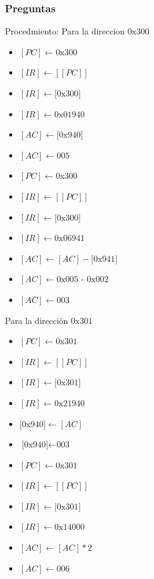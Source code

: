 \documentclass{article}
\begin{document}
\subsubsection{Preguntas}
\label{sec:org5305946}
Procedmiento:
Para la direccion \(\text{0x300}\)

\begin{itemize}
\item \([PC] \leftarrow \text{0x300}\)
\item \([IR] \leftarrow [[PC]]\)
\item \([IR] \leftarrow \text{[0x300]}\)
\item \([IR] \leftarrow \text{0x01940}\)
\item \([AC] \leftarrow \text{[0x940]}\)
\item \([AC] \leftarrow \text{005}\)

\item \([PC] \leftarrow \text{0x300}\)
\item \([IR] \leftarrow [[PC]]\)
\item \([IR] \leftarrow \text{[0x300]}\)
\item \([IR] \leftarrow \text{0x06941}\)
\item \([AC] \leftarrow [AC]-\text{[0x941]}\)
\item \([AC] \leftarrow \text{0x005 - 0x002}\)
\item \([AC] \leftarrow \text{003}\)
\end{itemize}

Para la dirección \(\text{0x301}\)

\begin{itemize}
\item \([PC] \leftarrow \text{0x301}\)
\item \([IR] \leftarrow [[PC]]\)
\item \([IR] \leftarrow \text{[0x301]}\)
\item \([IR] \leftarrow \text{0x21940}\)
\item \(\text{[0x940]} \leftarrow [AC]\)
\item \(\text{[0x940]} \leftarrow \text{003}\)

\item \([PC] \leftarrow \text{0x301}\)
\item \([IR] \leftarrow [[PC]]\)
\item \([IR] \leftarrow \text{[0x301]}\)
\item \([IR] \leftarrow \text{0x14000}\)
\item \([AC] \leftarrow [AC] * 2\)
\item \([AC] \leftarrow \text{006}\)
\end{itemize}
\end{document}
